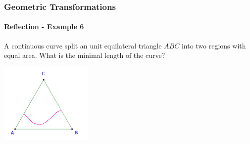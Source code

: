 \documentclass[8pt,xcolor=table,dvipsnames]{beamer}
\begin{document}
\begin{frame}[t]
    \frametitle{Geometric Transformations}
    \framesubtitle{Reflection - Example 6}
    \begin{example}
        A continuous curve split an unit equilateral triangle $ABC$ into two regions with equal area.
        What is the minimal length of the curve?    
    \end{example}

    \bigbreak
    \begin{center}
        \includegraphics[width=4.5cm]{./svg/pdf/24-25-t4-p20.pdf}
    \end{center}
\end{frame}
\end{document}
